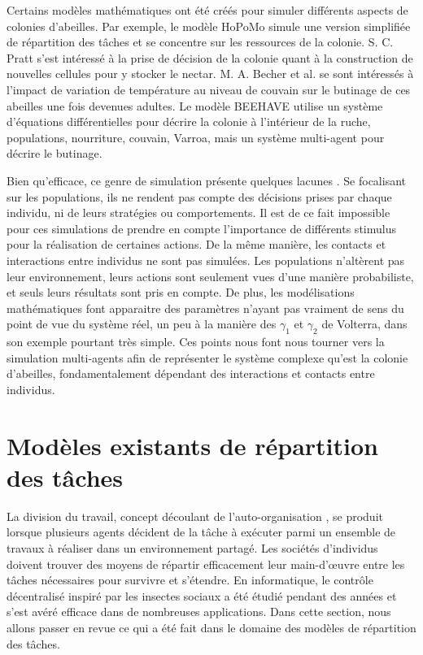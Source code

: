 		Certains modèles mathématiques ont été créés pour simuler différents aspects de colonies d'abeilles. Par exemple, le modèle HoPoMo \cite{schmickl_hopomo_2007} simule une version simplifiée de répartition des tâches et se concentre sur les ressources de la colonie. S. C. Pratt \cite{pratt_optimal_1999} s'est intéressé à la prise de décision de la colonie quant à la construction de nouvelles cellules pour y stocker le nectar. M. A. Becher et al. \cite{becher_brood_2010} se sont intéressés à l'impact de variation de température au niveau de couvain sur le butinage de ces abeilles une fois devenues adultes. Le modèle BEEHAVE \cite{becher_beehave_2014} utilise un système d'équations différentielles pour décrire la colonie à l'intérieur de la ruche, populations, nourriture, couvain, Varroa, mais un système multi-agent pour décrire le butinage.
		
		Bien qu'efficace, ce genre de simulation présente quelques lacunes \cite{drogoul_multi-agent_1992}. Se focalisant sur les populations, ils ne rendent pas compte des décisions prises par chaque individu, ni de leurs stratégies ou comportements. Il est de ce fait impossible pour ces simulations de prendre en compte l'importance de différents stimulus pour la réalisation de certaines actions. De la même manière, les contacts et interactions entre individus ne sont pas simulées. Les populations n'altèrent pas leur environnement, leurs actions sont seulement vues d'une manière probabiliste, et seuls leurs résultats sont pris en compte. De plus, les modélisations mathématiques font apparaitre des paramètres n'ayant pas vraiment de sens du point de vue du système réel, un peu à la manière des $\gamma_1$ et $\gamma_2$ de Volterra, dans son exemple pourtant très simple. Ces points nous font nous tourner vers la simulation multi-agents afin de représenter le système complexe qu'est la colonie d'abeilles, fondamentalement dépendant des interactions et contacts entre individus.
			
			
	\section{Modèles existants de répartition des tâches}
	La division du travail, concept découlant de l'auto-organisation \cite{labella_division_2006}, se produit lorsque plusieurs agents décident de la tâche à exécuter parmi un ensemble de travaux à réaliser dans un environnement partagé. Les sociétés d'individus doivent trouver des moyens de répartir efficacement leur main-d'œuvre entre les tâches nécessaires pour survivre et s'étendre. En informatique, le contrôle décentralisé inspiré par les insectes sociaux a été étudié pendant des années et s'est avéré efficace dans de nombreuses applications. Dans cette section, nous allons passer en revue ce qui a été fait dans le domaine des modèles de répartition des tâches.
	
